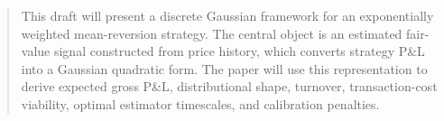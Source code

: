 \begin{abstract}
This draft will present a discrete Gaussian framework for an exponentially weighted mean-reversion strategy. The central object is an estimated fair-value signal constructed from price history, which converts strategy P\&L into a Gaussian quadratic form. The paper will use this representation to derive expected gross P\&L, distributional shape, turnover, transaction-cost viability, optimal estimator timescales, and calibration penalties.
\end{abstract}
